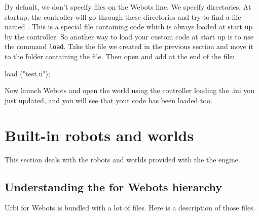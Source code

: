 By default, we don't specify files on the Webots 
line. We specify directories.  At startup, the \urbi controller will
go through these directories and try to find a file named
. This is a special file containing \us code
which is always loaded at start up by the \urbi controller. So another
way to load your custom \urbi code at start up is to use the command
\lstinline|load|.  Take the  file we created in the previous
section and move it to the folder containing the 
file. Then open  and add at the end of the file:

\begin{urbifixme}
load ("test.u");
\end{urbifixme}
Now launch Webots and open the world using the \urbi controller loading
the \urbi.ini you just updated, and you will see that your code has
been loaded too.


\section{Built-{}in robots and worlds}

This section deals with the robots and worlds provided with the the
engine.


\subsection{Understanding the \urbi for Webots hierarchy}

 Urbi for Webots is bundled with a lot of files. Here is a description of
those files.

